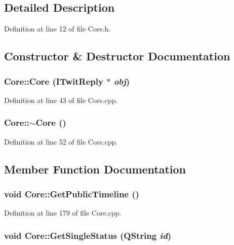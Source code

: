 \subsection{Detailed Description}


Definition at line 12 of file Core.h.

\subsection{Constructor \& Destructor Documentation}
\hypertarget{classCore_4d99e39664e6f9a1b885742f92d83ade}{
\subsubsection{\setlength{\rightskip}{0pt plus 5cm}Core::Core ({\bf ITwitReply} $\ast$ {\em obj})}}
\label{classCore_4d99e39664e6f9a1b885742f92d83ade}




Definition at line 43 of file Core.cpp.\hypertarget{classCore_776f8c46504b14183883c6273f93eaed}{
\subsubsection{\setlength{\rightskip}{0pt plus 5cm}Core::$\sim$Core ()}}
\label{classCore_776f8c46504b14183883c6273f93eaed}




Definition at line 52 of file Core.cpp.

\subsection{Member Function Documentation}
\hypertarget{classCore_e07b32f495c64e768eb74cf50585352c}{
\subsubsection{\setlength{\rightskip}{0pt plus 5cm}void Core::GetPublicTimeline ()}}
\label{classCore_e07b32f495c64e768eb74cf50585352c}




Definition at line 179 of file Core.cpp.\hypertarget{classCore_88d775139d0168f3fa24b4b4fda83386}{
\subsubsection{\setlength{\rightskip}{0pt plus 5cm}void Core::GetSingleStatus (QString {\em id})}}
\label{classCore_88d775139d0168f3fa24b4b4fda83386}




